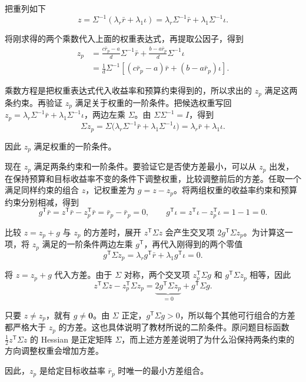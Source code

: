 \begin{solution}[label-content={证明},blank-type=none]
把重列如下
\[
 z=\Sigma^{-1}(\lambda_r\bar r+\lambda_1\iota)
  =\lambda_r\Sigma^{-1}\bar r+\lambda_1\Sigma^{-1}\iota.
\]

将刚求得的两个乘数代入上面的权重表达式，再提取公因子，得到
\[
 \begin{aligned}
 z_p
 &=\frac{c\bar r_p-a}{d}\Sigma^{-1}\bar r
   +\frac{b-a\bar r_p}{d}\Sigma^{-1}\iota\\
 &=\frac1d\Sigma^{-1}
   [(c\bar r_p-a)\bar r+(b-a\bar r_p)\iota].
 \end{aligned}
\]

乘数方程是把权重表达式代入收益率和预算约束得到的，所以求出的 $z_p$ 满足这两条约束。再验证 $z_p$ 满足关于权重的一阶条件。把候选权重写回 $z_p=\lambda_r\Sigma^{-1}\bar r+\lambda_1\Sigma^{-1}\iota$，两边左乘 $\Sigma$。由 $\Sigma\Sigma^{-1}=I$，得到
\[
 \Sigma z_p
 =\Sigma\bigl(\lambda_r\Sigma^{-1}\bar r+\lambda_1\Sigma^{-1}\iota\bigr)
 =\lambda_r\bar r+\lambda_1\iota.
\]

因此 $z_p$ 满足权重的一阶条件。

现在 $z_p$ 满足两条约束和一阶条件。要验证它是否使方差最小，可以从 $z_p$ 出发，在保持预算和目标收益率不变的条件下调整权重，比较调整前后的方差。任取一个满足同样约束的组合 $z$，记权重差为 $g=z-z_p$。将两组权重的收益率约束和预算约束分别相减，得到
\[
 g^{\mathsf T}\bar r=z^{\mathsf T}\bar r-z_p^{\mathsf T}\bar r
 =\bar r_p-\bar r_p=0,\qquad
 g^{\mathsf T}\iota=z^{\mathsf T}\iota-z_p^{\mathsf T}\iota=1-1=0.
\]

比较 $z=z_p+g$ 与 $z_p$ 的方差时，展开 $z^{\mathsf T}\Sigma z$ 会产生交叉项 $2g^{\mathsf T}\Sigma z_p$。为计算这一项，将 $z_p$ 满足的一阶条件两边左乘 $g^{\mathsf T}$，再代入刚得到的两个零值
\[
 g^{\mathsf T}\Sigma z_p
 =\lambda_r g^{\mathsf T}\bar r+\lambda_1 g^{\mathsf T}\iota=0.
\]

将 $z=z_p+g$ 代入方差。由于 $\Sigma$ 对称，两个交叉项 $z_p^{\mathsf T}\Sigma g$ 和 $g^{\mathsf T}\Sigma z_p$ 相等，因此
\[
 z^{\mathsf T}\Sigma z-z_p^{\mathsf T}\Sigma z_p
 =\underbrace{2g^{\mathsf T}\Sigma z_p}_{=0}+g^{\mathsf T}\Sigma g.
\]

只要 $z\ne z_p$，就有 $g\ne\mathbf 0$。由 $\Sigma$ 正定，$g^{\mathsf T}\Sigma g>0$，所以每个其他可行组合的方差都严格大于 $z_p$ 的方差。这也具体说明了教材所说的二阶条件。原问题目标函数 $\tfrac12 z^{\mathsf T}\Sigma z$ 的 Hessian 是正定矩阵 $\Sigma$，而上述方差差说明了为什么沿保持两条约束的方向调整权重会增加方差。

因此，$z_p$ 是给定目标收益率 $\bar r_p$ 时唯一的最小方差组合。
\end{solution}

